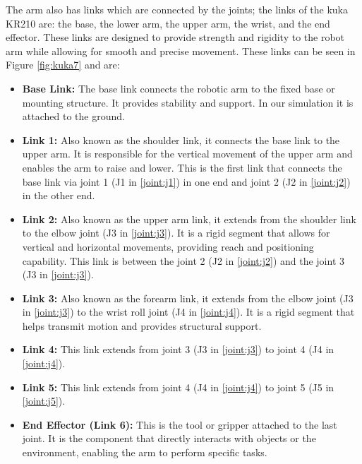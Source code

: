 \documentclass[12pt,oneside]{article}
\begin{document}
The arm also has links which are connected by the joints; the links of the kuka KR210 are: the base, the lower arm, the upper arm, the wrist, and the end effector. These links are designed to provide strength and rigidity to the robot arm while allowing for smooth and precise movement. These links can be seen in Figure \ref{fig:kuka7} and are:

\begin{itemize}
	\item \textbf{Base Link:} The base link connects the robotic arm to the fixed base or mounting structure. It provides stability and support. In our simulation it is attached to the ground.
	
	\item \textbf{Link 1:} Also known as the shoulder link, it connects the base link to the upper arm. It is responsible for the vertical movement of the upper arm and enables the arm to raise and lower. This is the first link that connects the base link via joint 1 (J1 in \ref{joint:j1}) in one end and joint 2 (J2 in \ref{joint:j2}) in the other end.
	
	\item \textbf{Link 2:} Also known as the upper arm link, it extends from the shoulder link to the elbow joint (J3 in \ref{joint:j3}). It is a rigid segment that allows for vertical and horizontal movements, providing reach and positioning capability. This link is between the joint 2 (J2 in \ref{joint:j2}) and the joint 3 (J3 in \ref{joint:j3}).
	
	\item \textbf{Link 3:} Also known as the forearm link, it extends from the elbow joint (J3 in \ref{joint:j3}) to the wrist roll joint (J4 in \ref{joint:j4}). It is a rigid segment that helps transmit motion and provides structural support.
	
	\item \textbf{Link 4: }This link extends from joint 3 (J3 in \ref{joint:j3}) to joint 4 (J4 in \ref{joint:j4}).
	
	\item \textbf{Link 5: }This link extends from joint 4 (J4 in \ref{joint:j4}) to joint 5 (J5 in \ref{joint:j5}).
	
	\item \textbf{End Effector (Link 6):} This is the tool or gripper attached to the last joint. It is the component that directly interacts with objects or the environment, enabling the arm to perform specific tasks.
	
\end{itemize}
\end{document}
